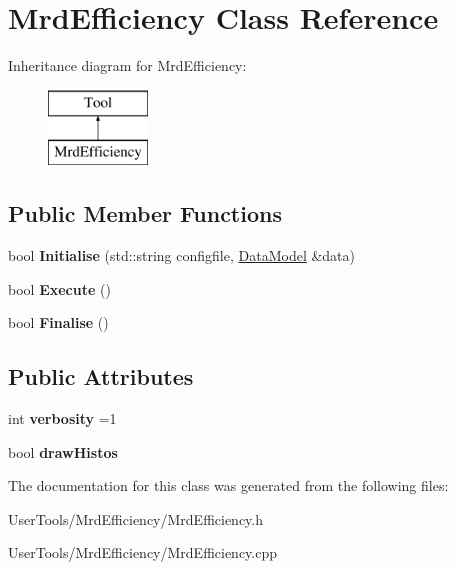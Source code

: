 \hypertarget{classMrdEfficiency}{\section{Mrd\-Efficiency Class Reference}
\label{classMrdEfficiency}
}
Inheritance diagram for Mrd\-Efficiency\-:\begin{figure}[H]
\begin{center}
\leavevmode
\includegraphics[height=2.000000cm]{classMrdEfficiency}
\end{center}
\end{figure}
\subsection*{Public Member Functions}
\begin{DoxyCompactItemize}
\item 
\hypertarget{classMrdEfficiency_a08728f36b55f16ae22b542b41af58c30}{bool {\bfseries Initialise} (std\-::string configfile, \hyperlink{classDataModel}{Data\-Model} \&data)}\label{classMrdEfficiency_a08728f36b55f16ae22b542b41af58c30}

\item 
\hypertarget{classMrdEfficiency_ada02439004731e9ab80cceaf5027ac77}{bool {\bfseries Execute} ()}\label{classMrdEfficiency_ada02439004731e9ab80cceaf5027ac77}

\item 
\hypertarget{classMrdEfficiency_a804e18645520f7ede27d4cd7d4a0d666}{bool {\bfseries Finalise} ()}\label{classMrdEfficiency_a804e18645520f7ede27d4cd7d4a0d666}

\end{DoxyCompactItemize}
\subsection*{Public Attributes}
\begin{DoxyCompactItemize}
\item 
\hypertarget{classMrdEfficiency_a96c39668e71df6a3e0261bf7aeac9dcb}{int {\bfseries verbosity} =1}\label{classMrdEfficiency_a96c39668e71df6a3e0261bf7aeac9dcb}

\item 
\hypertarget{classMrdEfficiency_af3a7b151047b6f71fcf1333f869c6a72}{bool {\bfseries draw\-Histos}}\label{classMrdEfficiency_af3a7b151047b6f71fcf1333f869c6a72}

\end{DoxyCompactItemize}


The documentation for this class was generated from the following files\-:\begin{DoxyCompactItemize}
\item 
User\-Tools/\-Mrd\-Efficiency/Mrd\-Efficiency.\-h\item 
User\-Tools/\-Mrd\-Efficiency/Mrd\-Efficiency.\-cpp\end{DoxyCompactItemize}
